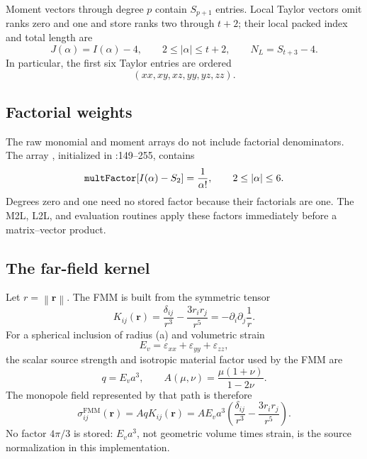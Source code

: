 \documentclass[11pt]{article}
\newcommand{\vect}[1]{\bm{#1}}
\newcommand{\abs}[1]{\left\lvert #1\right\rvert}
\newcommand{\norm}[1]{\left\lVert #1\right\rVert}
\newcommand{\code}[1]{\texttt{\detokenize{#1}}}
\begin{document}
Moment vectors through degree \(p\) contain \(S_{p+1}\) entries.  Local Taylor
vectors omit ranks zero and one and store ranks two through \(t+2\); their
local packed index and total length are
\begin{equation}
J(\alpha)=I(\alpha)-4,
\qquad
2\leq\abs{\alpha}\leq t+2,
\qquad
N_L=S_{t+3}-4.
\label{eq:taylor-layout}
\end{equation}
In particular, the first six Taylor entries are ordered
\[
(xx,xy,xz,yy,yz,zz).
\]

\subsection{Factorial weights}

The raw monomial and moment arrays do not include factorial denominators.
The array \code{multFactor}, initialized in :149--255,
contains
\begin{equation}
\code{multFactor}[I(\alpha)-S_2]=\frac{1}{\alpha!},
\qquad 2\leq\abs{\alpha}\leq6.
\label{eq:multfactor}
\end{equation}
Degrees zero and one need no stored factor because their factorials are one.
The M2L, L2L, and evaluation routines apply these factors immediately before a
matrix--vector product.

\subsection{The far-field kernel}

Let \(r=\norm{\vect{r}}\).  The FMM is built from the symmetric tensor
\begin{equation}
K_{ij}(\vect{r})
=\frac{\delta_{ij}}{r^3}-\frac{3r_i r_j}{r^5}
=-\partial_i\partial_j\frac{1}{r}.
\label{eq:kernel}
\end{equation}
For a spherical inclusion of radius (a) and volumetric strain
\[
E_v=\varepsilon_{xx}+\varepsilon_{yy}+\varepsilon_{zz},
\]
the scalar source strength and isotropic material factor used by the FMM are
\begin{equation}
q=E_v a^3,
\qquad
A(\mu,\nu)=\frac{\mu(1+\nu)}{1-2\nu}.
\label{eq:source-strength}
\end{equation}
The monopole field represented by that path is therefore
\begin{equation}
\sigma_{ij}^{\mathrm{FMM}}(\vect{r})
=AqK_{ij}(\vect{r})
=A E_v a^3
 \left(\frac{\delta_{ij}}{r^3}
       -\frac{3r_i r_j}{r^5}\right).
\label{eq:fmm-monopole}
\end{equation}
No factor \(4\pi/3\) is stored: \(E_va^3\), not geometric volume times strain,
is the source normalization in this implementation.
\end{document}
